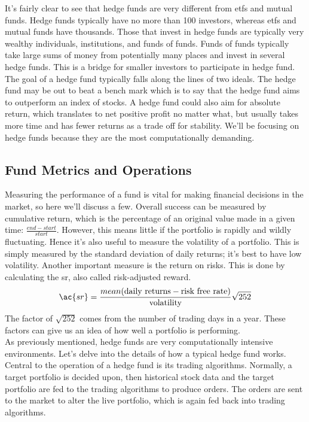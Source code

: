 It's fairly clear to see that hedge funds are very different from \ac{etf}s and mutual funds. Hedge funds typically have no more than 100 investors, whereas \ac{etf}s and mutual funds have thousands. Those that invest in hedge funds are typically very wealthy individuals, institutions, and funds of funds. Funds of funds typically take large sums of money from potentially many places and invest in several hedge funds. This is a bridge for smaller investors to participate in hedge fund. The goal of a hedge fund typically falls along the lines of two ideals. The hedge fund may be out to beat a bench mark which is to say that the hedge fund aims to outperform an index of stocks. A hedge fund could also aim for absolute return, which translates to net positive profit no matter what, but usually takes more time and has fewer returns as a trade off for stability. We'll be focusing on hedge funds because they are the most computationally demanding.

\subsection{Fund Metrics and Operations}
Measuring the performance of a fund is vital for making financial decisions in the market, so here we'll discuss a few. Overall success can be measured by cumulative return, which is the percentage of an original value made in a given time: $\frac{end-start}{start}$. However, this means little if the portfolio is rapidly and wildly fluctuating. Hence it's also useful to measure the volatility of a portfolio. This is simply measured by the standard deviation of daily returns; it's best to have low volatility. Another important measure is the return on risks. This is done by calculating the \ac{sr}, also called risk-adjusted reward. 
\begin{align*}
\ac{sr}=\frac{mean(\mbox{daily returns}-\mbox{risk free rate})}{\mbox{volatility}}\sqrt{252}
\end{align*}
The factor of $\sqrt{252}$ comes from the number of trading days in a year. These factors can give us an idea of how well a portfolio is performing.\\

As previously mentioned, hedge funds are very computationally intensive environments. Let's delve into the details of how a typical hedge fund works. Central to the operation of a hedge fund is its trading algorithms. Normally, a target portfolio is decided upon, then historical stock data and the target portfolio are fed to the trading algorithms to produce orders. The orders are sent to the market to alter the live portfolio, which is again fed back into trading algorithms. 
\newpage

